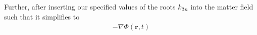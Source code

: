 \documentclass{article}
\begin{document}
Further, after inserting our specified values of the roots $k_{\bm{\beta}n}$ into the matter field such that it simplifies to
\begin{equation}
\begin{split}
-\nabla\Phi(\mathbf{r},t) 

\end{split}
\end{equation}
\end{document}
